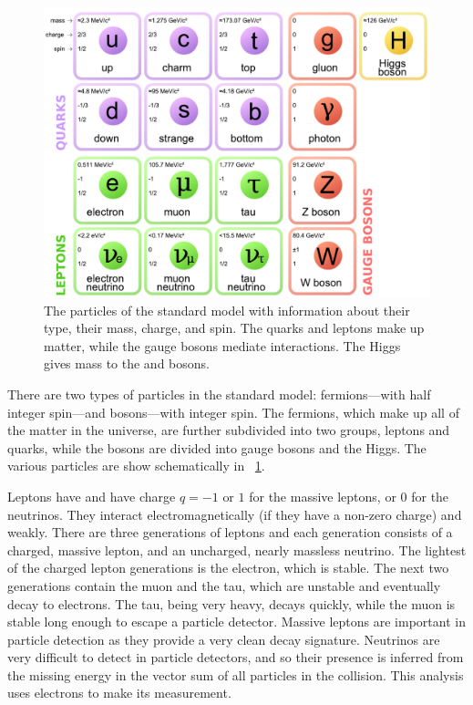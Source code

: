 \begin{figure}[!htbp]
    \centering
    \includegraphics[width=\textwidth]{figures/standard_model.pdf}
    \caption[
        The particles of the standard model.
    ]{
        The particles of the standard model with information about their
        type, their mass, charge, and spin. The quarks and leptons make up
        matter, while the gauge bosons mediate interactions. The Higgs gives
        mass to the \W and \Z bosons.
    }
    \label{fig:standard_model}
\end{figure}

There are two types of particles in the standard model: fermions---with half
integer spin---and bosons---with integer spin. The fermions, which make up all
of the matter in the universe, are further subdivided into two groups, leptons
and quarks, while the bosons are divided into gauge bosons and the Higgs.  The
various particles are show schematically in \FIG~\ref{fig:standard_model}.

Leptons have \spinhalf and have charge $q=-1 \text{ or } 1$ for the massive
leptons, or 0 for the neutrinos. They interact electromagnetically (if they
have a non-zero charge) and weakly. There are three generations of leptons and
each generation consists of a charged, massive lepton, and an uncharged, nearly
massless neutrino. The lightest of the charged lepton generations is the
electron, which is stable. The next two generations contain the muon and the
tau, which are unstable and eventually decay to electrons. The tau, being very
heavy, decays quickly, while the muon is stable long enough to escape a
particle detector. Massive leptons are important in particle detection as they
provide a very clean decay signature. Neutrinos are very difficult to detect in
particle detectors, and so their presence is inferred from the missing energy
in the vector sum of all particles in the collision. This analysis uses
electrons to make its measurement.

